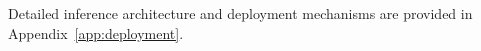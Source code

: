Detailed inference architecture and deployment mechanisms are provided in Appendix~\ref{app:deployment}.







